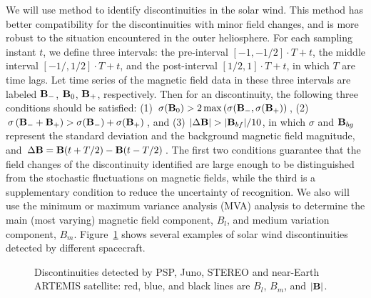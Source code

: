 \documentclass[
  letterpaper,
  DIV=11,
  numbers=noendperiod]{scrartcl}
\begin{document}
We will use \citet{liu2022a} method to identify discontinuities in the
solar wind. This method has better compatibility for the discontinuities
with minor field changes, and is more robust to the situation
encountered in the outer heliosphere. For each sampling instant \(t\),
we define three intervals: the pre-interval \([-1,-1/2]\cdot T+t\), the
middle interval \([-1/,1/2]\cdot T+t\), and the post-interval
\([1/2,1]\cdot T+t\), in which \(T\) are time lags. Let time series of
the magnetic field data in these three intervals are labeled
\({\bf B}_-\), \({\bf B}_0\), \({\bf B}_+\), respectively. Then for an
discontinuity, the following three conditions should be satisfied: (1)
\(\sigma({\bf B}_0)>2\max\left(\sigma({\bf B}_-, \sigma({\bf B}_+)\right)\),
(2)
\(\sigma\left({\bf B}_-+{\bf B}_+\right)>\sigma({\bf B}_-)+\sigma({\bf B}_+)\),
and (3) \(|\Delta {\bf B}|>|{\bf B}_{bf}|/10\), in which \(\sigma\) and
\({\bf B}_{bg}\) represent the standard deviation and the background
magnetic field magnitude, and
\(\Delta {\bf B}={\bf B}(t+T/2)-{\bf B}(t-T/2)\). The first two
conditions guarantee that the field changes of the discontinuity
identified are large enough to be distinguished from the stochastic
fluctuations on magnetic fields, while the third is a supplementary
condition to reduce the uncertainty of recognition. We also will use the
minimum or maximum variance analysis (MVA) analysis
\citep{sonnerupMinimumMaximumVariance1998, sonnerupMagnetopauseStructureAttitude1967}
to determine the main (most varying) magnetic field component, \(B_l\),
and medium variation component, \(B_m\). Figure~\ref{fig-examples} shows
several examples of solar wind discontinuities detected by different
spacecraft.

\begin{figure}


\caption{\label{fig-examples}Discontinuities detected by PSP, Juno,
STEREO and near-Earth ARTEMIS satellite: red, blue, and black lines are
\(B_l\), \(B_m\), and \(|{\bf B}|\).}

\end{figure}%
\end{document}
